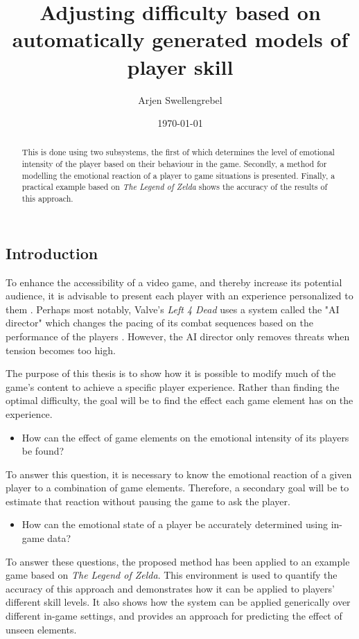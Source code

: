 \documentclass[a4paper]{article}
\title{Adjusting difficulty based on automatically generated models of player skill}
\author{Arjen Swellengrebel}
\date{\today}
\begin{document}
\maketitle

\begin{multicols*}{2}
\begin{abstract}
This is done using two subsystems, the first of which determines the level of emotional intensity of the player based on their behaviour in the game.
Secondly, a method for modelling the emotional reaction of a player to game situations is presented.
Finally, a practical example based on \emph{The Legend of Zelda} shows the accuracy of the results of this approach.
\end{abstract}

\section{Introduction}
To enhance the accessibility of a video game, and thereby increase its potential audience, it is advisable to present each player with an experience personalized to them \cite{playercentered}. Perhaps most notably, Valve's \emph{Left 4 Dead} uses a system called the "AI director" which changes the pacing of its combat sequences based on the performance of the players \cite{left4dead}. However, the AI director only removes threats when tension becomes too high.

The purpose of this thesis is to show how it is possible to modify much of the game's content to achieve a specific player experience. Rather than finding the optimal difficulty, the goal will be to find the effect each game element has on the experience.
\begin{itemize} \item[\textbf{1.}] How can the effect of game elements on the emotional intensity of its players be found? \end{itemize}
To answer this question, it is necessary to know the emotional reaction of a given player to a combination of game elements. Therefore, a secondary goal will be to estimate that reaction without pausing the game to ask the player.
\begin{itemize} \item[\textbf{2.}] How can the emotional state of a player be accurately determined using in-game data? \end{itemize}

To answer these questions, the proposed method has been applied to an example game based on \emph{The Legend of Zelda}. This environment is used to quantify the accuracy of this approach and demonstrates how it can be applied to players' different skill levels. It also shows how the system can be applied generically over different in-game settings, and provides an approach for predicting the effect of unseen elements.


\end{multicols*}
\end{document}
